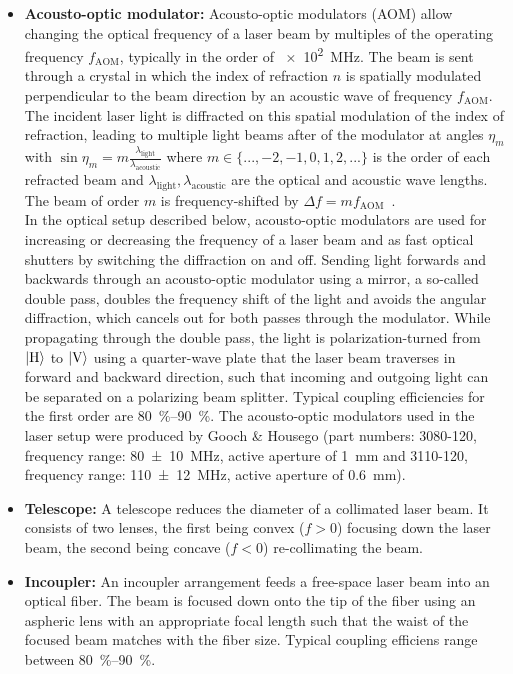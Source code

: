 \begin{itemize}
    \item \textbf{Acousto-optic modulator:} Acousto-optic modulators (AOM) allow changing the optical frequency of a laser beam by multiples of the operating frequency $f_\text{AOM}$, typically in the order of \SI[]{e2}{\mega\hertz}. The beam is sent through a crystal in which the index of refraction $n$ is spatially modulated perpendicular to the beam direction by an acoustic wave of frequency $f_\text{AOM}$. The incident laser light is diffracted on this spatial modulation of the index of refraction, leading to multiple light beams after of the modulator at angles $\eta_m$ with $\sin \eta_m = m\frac{\lambda_\text{light}}{\lambda_\text{acoustic}}$ where $m \in \{..., -2, -1, 0, 1, 2, ...\}$ is the order of each refracted beam and $\lambda_\text{light}, \lambda_\text{acoustic}$ are the optical and acoustic wave lengths. The beam of order $m$ is frequency-shifted by $\Delta f = mf_\text{AOM}$~\cite{hunsperger_acousto-optic_2002}.\\
    In the optical setup described below, acousto-optic modulators are used for increasing or decreasing the frequency of a laser beam and as fast optical shutters by switching the diffraction on and off. Sending light forwards and backwards through an acousto-optic modulator using a mirror, a so-called double pass, doubles the frequency shift of the light and avoids the angular diffraction, which cancels out for both passes through the modulator. While propagating through the double pass, the light is polarization-turned from $\Ket{\text{H}}$ to $\Ket{\text{V}}$ using a quarter-wave plate that the laser beam traverses in forward and backward direction, such that incoming and outgoing light can be separated on a polarizing beam splitter. Typical coupling efficiencies for the first order are \SIrange[]{80}{90}{\percent}. The acousto-optic modulators used in the laser setup were produced by Gooch \& Housego (part numbers: 3080-120, frequency range: \SI{80(10)}{\mega\hertz}, active aperture of \SI{1}{\milli\meter} and 3110-120, frequency range: \SI{110(12)}{\mega\hertz}, active aperture of \SI{0.6}{\milli\meter}).

    \item \textbf{Telescope:} A telescope reduces the diameter of a collimated laser beam. It consists of two lenses, the first being convex ($f > 0$) focusing down the laser beam, the second being concave ($f < 0$) re-collimating the beam.
    
    \item \textbf{Incoupler:} An incoupler arrangement feeds a free-space laser beam into an optical fiber. The beam is focused down onto the tip of the fiber using an aspheric lens with an appropriate focal length such that the waist of the focused beam matches with the fiber size. Typical coupling efficiens range between \SIrange[]{80}{90}{\percent}.
    

\end{itemize}
